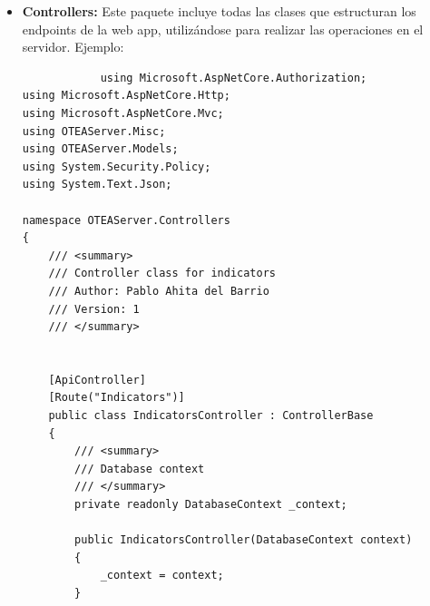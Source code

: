 \begin{itemize}
\begin{itemize}
\begin{lstlisting}
        [JsonProperty("indicatorVersion")]
        public int indicatorVersion { get; set; }
    }
}
        \end{lstlisting}
        Como se comprueba en el siguiente ejemplo, todos los campos del modelo
        de la clase \texttt{Indicator} tienen la propiedad de
        \textit{Newtonsoft.Json} denominada \texttt{JsonProperty}, la cual se
        utiliza para la serialización de los datos de este tipo para enviarlos
        en formato JSON.
        \item \textbf{Controllers: }Este paquete incluye todas las clases que
        estructuran los endpoints de la web app, utilizándose para realizar las
        operaciones en el servidor. Ejemplo:
        \begin{lstlisting}
            using Microsoft.AspNetCore.Authorization;
using Microsoft.AspNetCore.Http;
using Microsoft.AspNetCore.Mvc;
using OTEAServer.Misc;
using OTEAServer.Models;
using System.Security.Policy;
using System.Text.Json;

namespace OTEAServer.Controllers
{
    /// <summary>
    /// Controller class for indicators
    /// Author: Pablo Ahita del Barrio
    /// Version: 1
    /// </summary>
    
    
    [ApiController]
    [Route("Indicators")]
    public class IndicatorsController : ControllerBase
    {
        /// <summary>
        /// Database context
        /// </summary>
        private readonly DatabaseContext _context;

        public IndicatorsController(DatabaseContext context)
        {
            _context = context;
        }



\end{lstlisting}
\end{itemize}
\end{itemize}
